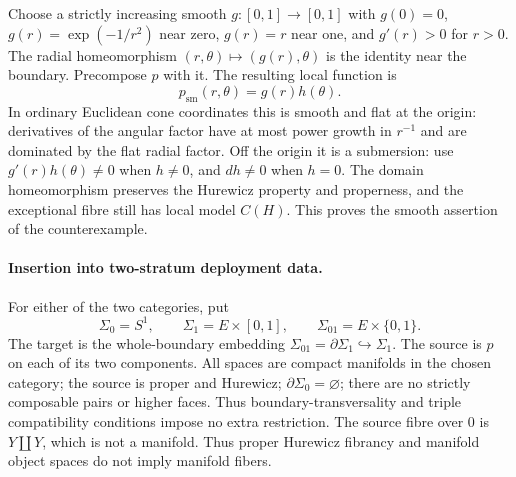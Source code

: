 \documentclass[11pt,a4paper]{article}
\theoremstyle{definition}
\begin{document}
Choose a strictly increasing smooth $g:[0,1]\to[0,1]$ with $g(0)=0$,
$g(r)=\exp(-1/r^2)$ near zero, $g(r)=r$ near one, and $g'(r)>0$ for $r>0$.
The radial homeomorphism $(r,\theta)\mapsto(g(r),\theta)$ is the identity
near the boundary.  Precompose $p$ with it.  The resulting local function
is
\[
 p_{\mathrm{sm}}(r,\theta)=g(r)h(\theta).
 \tag{Q9}
\]
In ordinary Euclidean cone coordinates this is smooth and flat at the
origin: derivatives of the angular factor have at most power growth in
$r^{-1}$ and are dominated by the flat radial factor.  Off the origin it
is a submersion: use $g'(r)h(\theta)\ne0$ when $h\ne0$, and $dh\ne0$ when
$h=0$.  The domain homeomorphism preserves the Hurewicz property and
properness, and the exceptional fibre still has local model $C(H)$.
This proves the smooth assertion of the counterexample.

\paragraph{Insertion into two-stratum deployment data.}
For either of the two categories, put
\[
 \Sigma_0=S^1,\qquad \Sigma_1=E\times[0,1],\qquad
 \Sigma_{01}=E\times\{0,1\}.
\]
The target is the whole-boundary embedding
$\Sigma_{01}=\partial\Sigma_1\hookrightarrow\Sigma_1$.
The source is $p$ on each of its two components.  All spaces are compact
manifolds in the chosen category; the source is proper and Hurewicz;
$\partial\Sigma_0=\varnothing$; there are no strictly composable pairs or
higher faces.  Thus boundary-transversality and triple compatibility
conditions impose no extra restriction.  The source fibre over $0$ is
$Y\amalg Y$, which is not a manifold.  Thus proper Hurewicz fibrancy and manifold object spaces do not imply manifold fibers.
\end{document}
